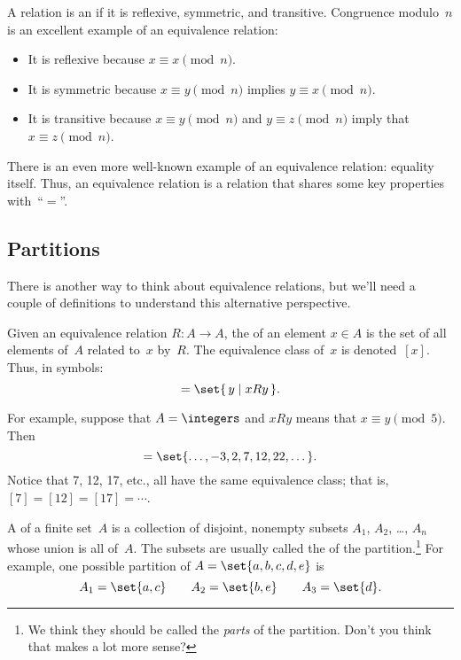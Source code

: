 A relation is an  if it is reflexive,
symmetric, and transitive.  Congruence modulo~$n$ is an excellent
example of an equivalence relation:
\begin{itemize}

\item
It is reflexive because $x \equiv x \pmod{n}$.

\item
It is symmetric because $x \equiv y \pmod{n}$ implies $y \equiv x
\pmod{n}$.

\item
It is transitive because $x \equiv y \pmod{n}$ and $y \equiv z
\pmod{n}$ imply that $x \equiv z \pmod{n}$.

\end{itemize}
There is an even more well-known example of an equivalence relation:
equality itself.  Thus, an equivalence relation is a relation that
shares some key properties with~``$=$''.

\subsection{Partitions}

There is another way to think about equivalence relations, but we'll
need a couple of definitions to understand this alternative
perspective.

\begin{definition}\label{def:equiv_class}

Given an equivalence relation $R : A \to A$, the  of an element $x \in A$  is the set of all elements of~$A$
related to~$x$ by~$R$.  The equivalence class of~$x$ is
denoted~$[x]$.  Thus, in symbols:
\begin{equation*}
    [x] = \set{\, y \mid x R y \,}.
\end{equation*}
\end{definition}

For example, suppose that $A = \integers$ and $x R y$ means that $x
\equiv y \pmod{5}$.  Then
\begin{equation*}
    [7] = \set{ \dots, -3, 2, 7, 12, 22, \dots }.
\end{equation*}
Notice that 7, 12, 17, etc., all have the same equivalence class; that
is, $[7] = [12] = [17] = \cdots$.

\begin{definition}\label{def:partition}

A  of a finite set~$A$ is a collection of disjoint,
nonempty subsets $A_1$, $A_2$, \dots, $A_n$ whose union is all of~$A$.  The subsets are
usually called the  of the partition.\footnote{We think
  they should be called the \emph{parts} of the partition. Don't you
  think that makes a lot more sense?}  For example, one possible
partition of $A = \set{a, b, c, d, e}$ is
\begin{equation*}
    A_1 = \set{a, c}
    \qquad
    A_2 = \set{b, e}
    \qquad
    A_3 = \set{d}.
\end{equation*}
\end{definition}

